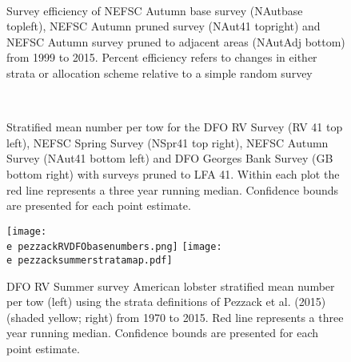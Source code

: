 \documentclass[11pt]{article}
\newcommand{\e}{/backup/bio_data/bio.lobster/figures/} %
\begin{document}
        \begin{figure}
        \centering
        \\
        \caption{Survey efficiency of NEFSC Autumn base survey (NAutbase topleft), NEFSC Autumn pruned survey (NAut41 topright) and NEFSC Autumn survey pruned to adjacent areas (NAutAdj bottom) from 1999 to 2015. Percent efficiency refers to changes in either strata or allocation scheme relative to a simple random survey }
        \end{figure}
        \clearpage





\begin{figure}
\centering
{}
\\

\caption{Stratified mean number per tow for the DFO RV Survey (RV 41 top left), NEFSC Spring Survey (NSpr41 top right), NEFSC Autumn Survey (NAut41 bottom left) and DFO Georges Bank Survey (GB bottom right) with surveys pruned to LFA 41. Within each plot the red line represents a three year running median. Confidence bounds are presented for each point estimate.}
\end{figure}
\clearpage


\begin{landscape}
\begin{figure}
\centering
    \texttt{[image: \\e pezzackRVDFObasenumbers.png]} 
    \texttt{[image: \\e pezzacksummerstratamap.pdf]} 
    
    \caption{DFO RV Summer survey American lobster stratified mean number per tow (left) using the strata definitions of Pezzack et al. (2015) (shaded yellow; right) from 1970 to 2015. Red line represents a three year running median. Confidence bounds are presented for each point estimate.}

\end{figure}
\end{landscape}
\end{document}

